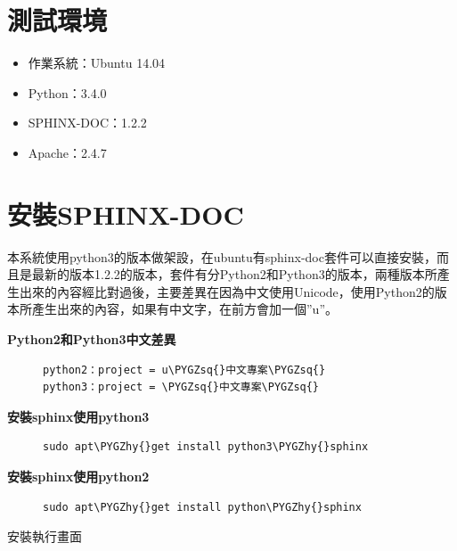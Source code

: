 \documentclass[letterpaper,10pt,english]{sphinxmanual}
\def\PYGZhy{\char`\-}
\def\PYGZsq{\char`\'}
\begin{document}
\section{測試環境}
\label{_doc/sphinx-doc/index:id1}\begin{itemize}
\item {} 
作業系統：Ubuntu 14.04

\item {} 
Python：3.4.0

\item {} 
SPHINX-DOC：1.2.2

\item {} 
Apache：2.4.7

\end{itemize}


\section{安裝SPHINX-DOC}
\label{_doc/sphinx-doc/index:id2}
本系統使用python3的版本做架設，在ubuntu有sphinx-doc套件可以直接安裝，而且是最新的版本1.2.2的版本，套件有分Python2和Python3的版本，兩種版本所產生出來的內容經比對過後，主要差異在因為中文使用Unicode，使用Python2的版本所產生出來的內容，如果有中文字，在前方會加一個''u''。
\begin{description}
\item[{\textbf{Python2和Python3中文差異}}] \leavevmode
\begin{Verbatim}[commandchars=\\\{\}]
python2：project = u\PYGZsq{}中文專案\PYGZsq{}
python3：project = \PYGZsq{}中文專案\PYGZsq{}
\end{Verbatim}

\item[{\textbf{安裝sphinx使用python3}}] \leavevmode
\begin{Verbatim}[commandchars=\\\{\}]
sudo apt\PYGZhy{}get install python3\PYGZhy{}sphinx
\end{Verbatim}

\item[{\textbf{安裝sphinx使用python2}}] \leavevmode
\begin{Verbatim}[commandchars=\\\{\}]
sudo apt\PYGZhy{}get install python\PYGZhy{}sphinx
\end{Verbatim}

\end{description}

安裝執行畫面
\end{document}
